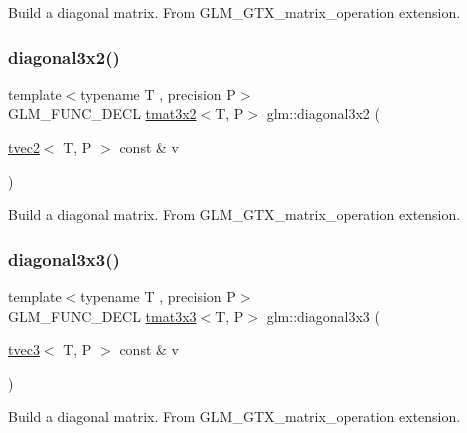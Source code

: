 Build a diagonal matrix. From G\+L\+M\+\_\+\+G\+T\+X\+\_\+matrix\+\_\+operation extension. \mbox{\label{group__gtx__matrix__operation_ga586e1ced91fd8a7c414186a200f13532}} 
\subsubsection{\texorpdfstring{diagonal3x2()}{diagonal3x2()}}
{\footnotesize\ttfamily template$<$typename T , precision P$>$ \\
G\+L\+M\+\_\+\+F\+U\+N\+C\+\_\+\+D\+E\+CL \hyperlink{structglm_1_1tmat3x2}{tmat3x2}$<$T, P$>$ glm\+::diagonal3x2 (\begin{DoxyParamCaption}\item[{\hyperlink{structglm_1_1tvec2}{tvec2}$<$ T, P $>$ const \&}]{v }\end{DoxyParamCaption})}

Build a diagonal matrix. From G\+L\+M\+\_\+\+G\+T\+X\+\_\+matrix\+\_\+operation extension. \mbox{\label{group__gtx__matrix__operation_ga8e817dba22f2305cdebae07bbbe0360c}} 
\subsubsection{\texorpdfstring{diagonal3x3()}{diagonal3x3()}}
{\footnotesize\ttfamily template$<$typename T , precision P$>$ \\
G\+L\+M\+\_\+\+F\+U\+N\+C\+\_\+\+D\+E\+CL \hyperlink{structglm_1_1tmat3x3}{tmat3x3}$<$T, P$>$ glm\+::diagonal3x3 (\begin{DoxyParamCaption}\item[{\hyperlink{structglm_1_1tvec3}{tvec3}$<$ T, P $>$ const \&}]{v }\end{DoxyParamCaption})}

Build a diagonal matrix. From G\+L\+M\+\_\+\+G\+T\+X\+\_\+matrix\+\_\+operation extension. \mbox{\label{group__gtx__matrix__operation_gae3f85af86c18c80f2acbe3223feb8e81}} 
